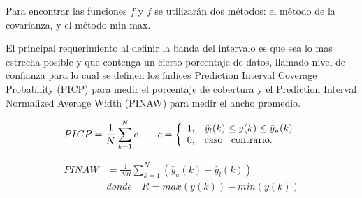 \documentclass[12pt]{article}
\begin{document}
Para encontrar las funciones $\underline{f}$ y $\bar{f}$ se utilizarán dos métodos: el método
de la covarianza, y el método min-max.

El principal requerimiento al definir la banda del intervalo es que sea lo mas estrecha
posible y que contenga un cierto porcentaje de datos, llamado nivel de confianza para lo cual se definen los índices Prediction Interval Coverage
Probability (PICP) para medir el porcentaje de cobertura y el Prediction Interval Normalized
Average Width (PINAW) para medir el ancho promedio.

\begin{equation}
PICP=\frac{1}{N}\sum_{k=1}^{N}c\qquad c=\left\{
                                          \begin{array}{ll}
                                            1, & \hbox{$\hat{y}_l(k) \leq y(k) \leq \hat{y}_u(k)$} \\
                                            0, & \hbox{caso \: contrario.}
                                          \end{array}
                                        \right.
\label{e_PICP}
\end{equation}

\begin{align}
PINAW &=\frac{1}{NR}\sum_{k=1}^{N}(\hat{y}_u(k)-\hat{y}_l(k)) \qquad \\
&donde\quad R=max(y(k))-min(y(k))\nonumber
\label{e_PINAW}
\end{align}
\end{document}
